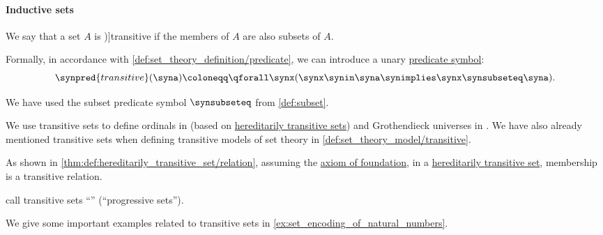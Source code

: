 \paragraph{Inductive sets}

\begin{definition}\label{def:transitive_set}
  We say that a set \( A \) is \term[ru=транзитивное (множество) (\cite[86]{ШеньВерещагин2020НачалаТеорииМножеств})]{transitive} if the members of \( A \) are also subsets of \( A \).

  Formally, in accordance with \cref{def:set_theory_definition/predicate}, we can introduce a unary \hyperref[def:fol_signature/predicate]{predicate symbol}:
  \begin{equation*}
    \synpred{transitive}(\syna) \coloneqq \qforall \synx (\synx \synin \syna \synimplies \synx \synsubseteq \syna).
  \end{equation*}

  We have used the subset predicate symbol \( {\synsubseteq} \) from \cref{def:subset}.
\end{definition}
\begin{comments}
  \item We use transitive sets to define ordinals in  (based on \hyperref[def:hereditarily_transitive_set]{hereditarily transitive sets}) and Grothendieck universes in . We have also already mentioned transitive sets when defining transitive models of set theory in \cref{def:set_theory_model/transitive}.

  \item As shown in \cref{thm:def:hereditarily_transitive_set/relation}, assuming the \hyperref[def:zfc/foundation]{axiom of foundation}, in a \hyperref[def:hereditarily_transitive_set]{hereditarily transitive set}, membership is a transitive relation.

  \item \Textcite[132]{КолмогоровДрагалин2006ЛогикаДополнительныеГлавы} call transitive sets \enquote{} (\enquote{progressive sets}).

  \item We give some important examples related to transitive sets in \cref{ex:set_encoding_of_natural_numbers}.
\end{comments}

